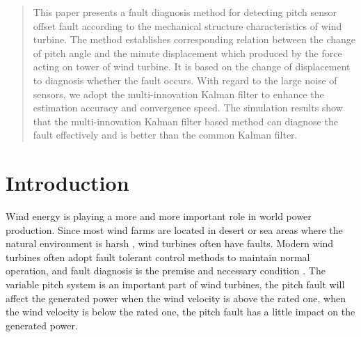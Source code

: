 \date{}

\maketitle


\begin{abstract}

This paper presents a fault diagnosis method for detecting pitch sensor
offset fault according to the mechanical structure characteristics of wind turbine.
The method establishes corresponding relation between the change of pitch angle
and the minute displacement which produced by the force acting on tower of
wind turbine. It is based on the change of displacement to diagnosis whether
the fault occurs. With regard to the large noise of sensors, we adopt the
multi-innovation Kalman filter to enhance the estimation accuracy and
convergence speed. The simulation results show that the multi-innovation
Kalman filter based method can diagnose the fault effectively and is
better than the common Kalman filter.



\end{abstract}


\section{Introduction}

Wind energy is playing a more and more important role in world power
production. Since most wind farms are located in desert or sea
areas where the natural environment is harsh \cite{ref:2},
wind turbines often have faults. Modern wind turbines often adopt fault
tolerant control methods to maintain normal operation, and fault
diagnosis is the premise and necessary condition \cite{ref:3}. The variable pitch
system is an important part of wind turbines, the pitch fault
will affect the generated power when the wind velocity is above the rated
one, when the wind velocity is below the rated one, the pitch fault has
a little impact on the generated power.

